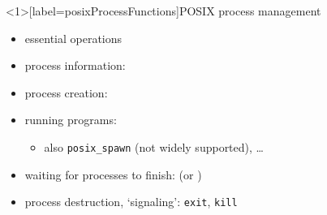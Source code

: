 \begin{frame}<1>[label=posixProcessFunctions]{POSIX process management}
\begin{itemize}
\item essential operations
\vspace{.5cm}
\item process information: 
\item process creation: 
\item running programs: 
\begin{itemize}
\item {\fontsize{9}{10}\selectfont also \texttt{posix\_spawn} (not widely supported), \ldots}
\end{itemize}
\item waiting for processes to finish: \texttt{} {\small (or \texttt{})}
\item process destruction, `signaling': \texttt{exit}, \texttt{kill}
\end{itemize}
\end{frame}
